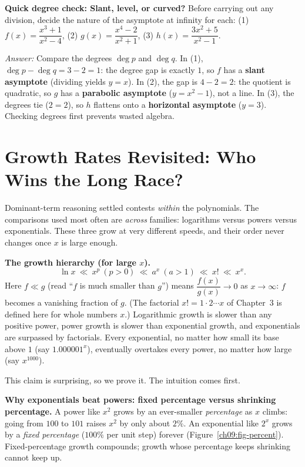 \begin{walkbox}
\textbf{Quick degree check: Slant, level, or curved?} Before carrying out any
division, decide the nature of the asymptote at infinity for each:
(1) $f(x) = \dfrac{x^3+1}{x^2-4}$, \quad
(2) $g(x) = \dfrac{x^4-2}{x^2+1}$, \quad
(3) $h(x) = \dfrac{3x^2+5}{x^2-1}$.

\emph{Answer:} Compare the degrees $\deg p$ and $\deg q$.
In (1), $\deg p - \deg q = 3-2 = 1$: the degree gap is exactly $1$, so $f$ has a
\textbf{slant asymptote} (dividing yields $y=x$).
In (2), the gap is $4-2 = 2$: the quotient is quadratic, so $g$ has a
\textbf{parabolic asymptote} ($y=x^2-1$), not a line.
In (3), the degrees tie ($2=2$), so $h$ flattens onto a \textbf{horizontal
asymptote} ($y=3$). Checking degrees first prevents wasted algebra.
\end{walkbox}

\section{Growth Rates Revisited: Who Wins the Long Race?}
\label{ch09:growth}

Dominant-term reasoning settled contests \emph{within} the polynomials. The
comparisons used most often are \emph{across} families: logarithms
versus powers versus exponentials. These three grow at very different speeds,
and their order never changes once $x$ is large enough.

\begin{focusbox}
\textbf{The growth hierarchy (for large $x$).}
\[
   \ln x \ \ll\ x^{p}\ (p>0) \ \ll\ a^{x}\ (a>1) \ \ll\ x! \ \ll\ x^{x}.
\]
Here $f \ll g$ (read ``$f$ is much smaller than $g$'') means
$\dfrac{f(x)}{g(x)}\to 0$ as $x\to\infty$: $f$ becomes a vanishing fraction of
$g$. (The factorial $x!=1\cdot2\cdots x$ of Chapter~3 is defined here for whole
numbers $x$.) Logarithmic growth is slower than any positive power, power
growth is slower than exponential growth, and exponentials are surpassed by factorials.
Every exponential, no matter how small its base above $1$ (say $1.000001^x$),
eventually overtakes every power, no matter how large (say $x^{1000}$).
\end{focusbox}

This claim is surprising, so we prove it. The intuition comes first.

\begin{intuitionbox}
\textbf{Why exponentials beat powers: fixed percentage versus shrinking
percentage.} A power like $x^2$ grows by an ever-smaller \emph{percentage} as $x$
climbs: going from $100$ to $101$ raises $x^2$ by only about $2\%$. An
exponential like $2^x$ grows by a \emph{fixed percentage} ($100\%$ per unit
step) forever (Figure~\ref{ch09:fig-percent}). Fixed-percentage growth
compounds; growth whose percentage keeps shrinking cannot keep up.
\end{intuitionbox}

